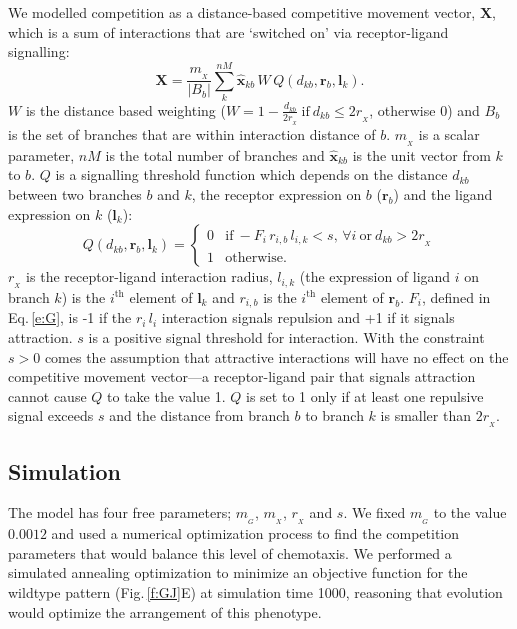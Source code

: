 \documentclass[11pt, a4paper]{article}
\begin{document}
 We modelled competition as a distance-based competitive movement vector, $\mathbf{X}$, which is a sum of interactions that are `switched on' via receptor-ligand signalling:
%
\begin{equation} \label{e:X}
\mathbf{X} = \frac{m_{\!_X}}{|B_{b}|} \sum_k^{nM} \hat{\mathbf{x}}_{kb}\,W\,Q(d_{kb}, \mathbf{r}_{b}, \mathbf{l}_{k}).
\end{equation}
%
$W$ is the distance based weighting ($W = 1-\frac{d_{kb}}{2r_{\!_X}}~\mathrm{if}~  d_{kb}\leq 2r_{\!_X}$, otherwise $0$) and $B_{b}$ is the set of branches that are within interaction distance of $b$. $m_{\!_X}$ is a scalar parameter, $nM$ is the total number of branches and $\hat{\mathbf{x}}_{kb}$ is the unit vector from $k$ to $b$.
%
$Q$ is a signalling threshold function which depends on the distance $d_{kb}$ between two branches $b$ and $k$, the receptor expression on $b$ ($\mathbf{r}_b$) and the ligand expression on $k$ ($\mathbf{l}_k$):
%
\begin{equation}
Q(d_{kb}, \mathbf{r}_{b}, \mathbf{l}_{k}) = \begin{cases}
                 0 & \mathrm{if}~-F_i\,r_{i,b}\,l_{i,k} <
                 s,\,\forall{i}~\mathrm{or}~d_{kb} > 2r_{\!_X} \\
                 1 & \mathrm{otherwise.}
     \end{cases}
\end{equation}
%
$r_{\!_X}$ is the receptor-ligand interaction radius, $l_{i,k}$ (the expression of ligand $i$ on branch $k$) is the $i^{\mathrm{th}}$ element of $\mathbf{l}_k$ and $r_{i,b}$ is the $i^{\mathrm{th}}$ element of $\mathbf{r}_b$. 
$F_i$, defined in Eq.\,\ref{e:G}, is -1 if the $r_{i}\,l_{i}$ interaction signals repulsion and +1 if it signals attraction.
$s$ is a positive signal threshold for interaction.
With the constraint $s>0$ comes the assumption that attractive interactions will have no effect on the competitive movement vector---a receptor-ligand pair that signals attraction cannot cause $Q$ to take the value 1. 
$Q$ is set to 1 only if at least one repulsive signal exceeds $s$ and the distance from branch $b$ to branch $k$ is smaller than $2 r_{\!_X}$.

\subsection*{Simulation}

The model has four free parameters; $m_{\!_G}$, $m_{\!_X}$, $r_{\!_X}$ and $s$. We fixed $m_{\!_G}$ to the value $0.0012$ and used a numerical optimization process to find the competition parameters that would balance this level of chemotaxis.
We performed a simulated annealing optimization to minimize an objective function for the wildtype pattern (Fig.\,\ref{f:GJ}E) at simulation time 1000, reasoning that evolution would optimize the arrangement of this phenotype.
\end{document}
